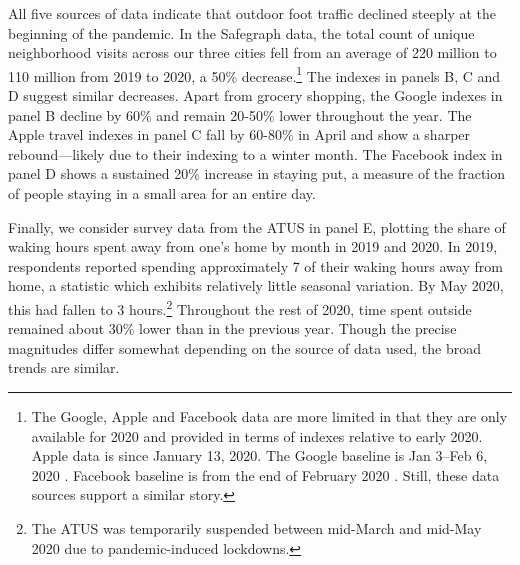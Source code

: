 \documentclass[12pt]{article}
\begin{document}
All five sources of data indicate that outdoor foot traffic declined steeply at the beginning of the pandemic. In the Safegraph data, the total count of unique neighborhood visits across our three cities fell from an average of 220 million to 110 million from 2019 to 2020, a 50\% decrease.\footnote{The Google, Apple and Facebook data are more limited in that they are only available for 2020 and provided in terms of indexes relative to early 2020. Apple data is since January 13, 2020. The Google baseline is Jan 3–Feb 6, 2020 \citep{google_data}. Facebook baseline is from the end of February 2020 \citep{facebook_documentation}. Still, these data sources support a similar story.} The indexes in panels B, C and D suggest similar decreases. Apart from grocery shopping, the Google indexes in panel B decline by 60\% and remain 20-50\% lower throughout the year. The Apple travel indexes in panel C  fall by 60-80\% in April and show a sharper rebound---likely due to their indexing to a winter month. The Facebook index in panel D shows a sustained 20\% increase in staying put, a measure of the fraction of people staying in a small area for an entire day.

Finally, we consider survey data from the ATUS in panel E, plotting the share of waking hours spent away from one's home by month in 2019 and 2020. In 2019, respondents reported spending approximately 7 of their waking hours away from home, a statistic which exhibits relatively little seasonal variation. By May 2020, this had fallen to 3 hours.\footnote{The ATUS was temporarily suspended between mid-March and mid-May 2020 due to pandemic-induced lockdowns.} Throughout the rest of 2020, time spent outside remained about 30\% lower than in the previous year. Though the precise magnitudes differ somewhat depending on the source of data used, the broad trends are similar.
\end{document}
